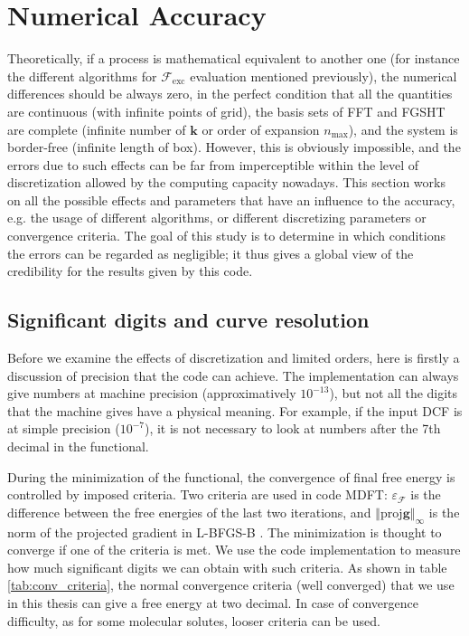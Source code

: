 
\chapter{Numerical Accuracy\label{chpt:accuracy}}

Theoretically, if a process is mathematical equivalent to another
one (for instance the different algorithms for $\mathcal{F}_{\mathrm{exc}}$
evaluation mentioned previously), the numerical differences should
be always zero, in the perfect condition that all the quantities are
continuous (with infinite points of grid), the basis sets of \acs{FFT}
and \acs{FGSHT} are complete (infinite number of $\mathbf{k}$ or
order of expansion $n_{\max}$), and the system is border-free (infinite
length of box). However, this is obviously impossible, and the errors
due to such effects can be far from imperceptible within the level
of discretization allowed by the computing capacity nowadays. This
section works on all the possible effects and parameters that have
an influence to the accuracy, e.g. the usage of different algorithms,
or different discretizing parameters or convergence criteria. The
goal of this study is to determine in which conditions the errors
can be regarded as negligible; it thus gives a global view of the
credibility for the results given by this code.

\section{Significant digits and curve resolution}

Before we examine the effects of discretization and limited orders,
here is firstly a discussion of precision that the code can achieve.
The implementation can always give numbers at machine precision (approximatively
$10^{-13}$), but not all the digits that the machine gives have a
physical meaning. For example, if the input \acs{DCF} is at simple
precision ($10^{-7}$), it is not necessary to look at numbers after
the 7th decimal in the functional. 

During the minimization of the functional, the convergence of final
free energy is controlled by imposed criteria. Two criteria are used
in code MDFT: $\varepsilon_{\mathcal{F}}$ is the difference between
the free energies of the last two iterations, and $\left\Vert \mathrm{proj}\mathbf{g}\right\Vert _{\infty}$
is the norm of the projected gradient in L-BFGS-B \citep{Zhu_1994_bfgs,Zhu_bfgs_1997_algorithm}.
The minimization is thought to converge if one of the criteria is
met. We use the code implementation to measure how much significant
digits we can obtain with such criteria. As shown in table \ref{tab:conv_criteria},
the normal convergence criteria (well converged) that we use in this
thesis can give a free energy at two decimal. In case of convergence
difficulty, as for some molecular solutes, looser criteria can be
used.

